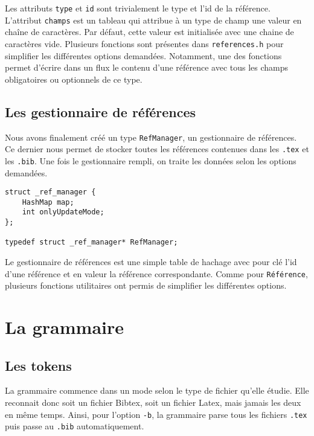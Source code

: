 \documentclass[hidelinks, a4paper,11pt,twoside,final]{article}
\begin{document}
Les attributs \texttt{type} et \texttt{id} sont trivialement le type et l'id de la référence.
L'attribut \texttt{champs} est un tableau qui attribue à un type de champ une valeur en chaîne de caractères.
Par défaut, cette valeur est initialisée avec une chaine de caractères vide.
Plusieurs fonctions sont présentes dans \texttt{references.h} pour simplifier les différentes options demandées.
Notamment, une des fonctions permet d'écrire dans un flux le contenu d'une référence avec tous les champs obligatoires ou optionnels de ce type.

\subsection {Les gestionnaire de références}
Nous avons finalement créé un type \texttt{RefManager}, un gestionnaire de références.
Ce dernier nous permet de stocker toutes les références contenues dans les \texttt{.tex} et les \texttt{.bib}. 
Une fois le gestionnaire rempli, on traite les données selon les options demandées.

\begin{lstlisting}
struct _ref_manager {
	HashMap map;
	int onlyUpdateMode;
};

typedef struct _ref_manager* RefManager;
\end{lstlisting}

Le gestionnaire de références est une simple table de hachage avec pour clé l'id d'une référence et en valeur la référence correspondante.
Comme pour \texttt{Référence}, plusieurs fonctions utilitaires ont permis de simplifier les différentes options.

\section{La grammaire}
\subsection{Les tokens}
La grammaire commence dans un mode selon le type de fichier qu'elle étudie. Elle reconnait donc soit un fichier Bibtex, 
soit un fichier Latex, mais jamais les deux en même temps. Ainsi, pour l'option \texttt{-b}, la grammaire parse tous les fichiers \texttt{.tex} puis passe au \texttt{.bib} automatiquement.
\end{document}
